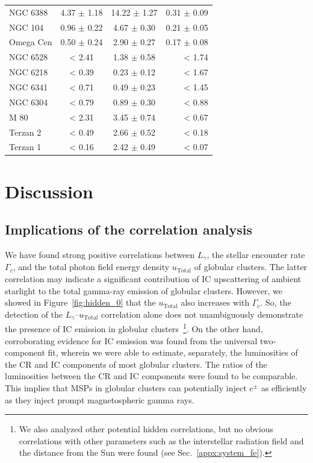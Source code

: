 \documentclass[doublespace,nopageskip]{VTthesis}
\begin{document}
\begin{table}
\begin{tabular}{lccr}
NGC 6388 & 4.37 $\pm$ 1.18 & 14.22 $\pm$ 1.27 & 0.31 $\pm$ 0.09 \\
NGC 104 & 0.96 $\pm$ 0.22 & 4.67 $\pm$ 0.30 & 0.21 $\pm$ 0.05 \\
Omega Cen & 0.50 $\pm$ 0.24 & 2.90 $\pm$ 0.27 & 0.17 $\pm$ 0.08 \\
NGC 6528 & < 2.41 & 1.38 $\pm$ 0.58 & < 1.74 \\
NGC 6218 & < 0.39  &  0.23 $\pm$ 0.12 & < 1.67 \\
NGC 6341 & < 0.71  &  0.49 $\pm$ 0.23 & < 1.45 \\
NGC 6304 & < 0.79  &  0.89 $\pm$ 0.30 & < 0.88 \\
M 80 & < 2.31  &  3.45 $\pm$ 0.74 & < 0.67 \\
Terzan 2 & < 0.49  &  2.66 $\pm$ 0.52 & < 0.18 \\
Terzan 1 & < 0.16  &  2.42 $\pm$ 0.49 & < 0.07 \\
\bottomrule
    \end{tabular}
    \label{tab:ratio}
\end{table}

\section{Discussion}\label{sec:discussion_GC}

\subsection{Implications of the correlation analysis}

We have found strong positive correlations between $L_\gamma$, the stellar encounter rate $\Gamma_c$, and the total photon field energy density $u_\mathrm{Total}$ of globular clusters. The latter correlation may indicate a significant contribution of IC upscattering of ambient starlight to the total gamma-ray emission of globular clusters. However, we showed in Figure~\ref{fig:hidden_0} that the $u_\mathrm{Total}$ also increases with $\Gamma_c$. So, the detection of the $L_\gamma$--$u_\mathrm{Total}$ correlation alone does not unambiguously demonstrate the presence of IC emission in globular clusters~\footnote{We also analyzed other potential hidden correlations, but no obvious correlations with other parameters such as the interstellar radiation field and the distance from the Sun were found (see Sec.~\ref{appx:system_fe}).}. On the other hand, corroborating evidence for IC emission was found from the universal two-component fit, wherein we were able to estimate, separately, the luminosities of the CR and IC components of most globular clusters. The ratios of the luminosities between the CR and IC components were found to be comparable. This implies that MSPs in globular clusters can potentially inject $e^{\pm}$ as efficiently as they inject prompt magnetospheric gamma rays.
\end{document}
